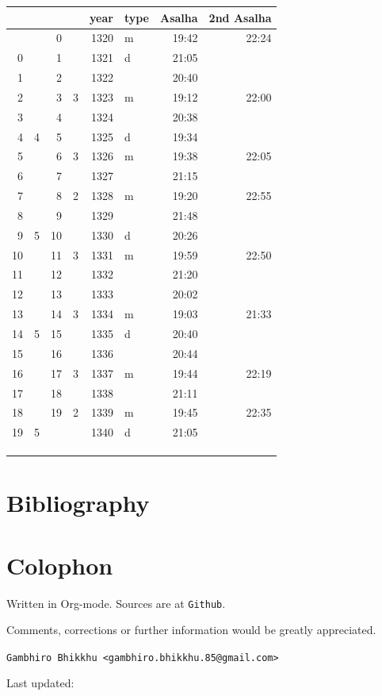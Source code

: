 \documentclass[11pt,oneside]{memoir-article}
\begin{document}
\begin{center}
\begin{tabular}{rrrrrlrr}
 &  &  &  & year & type & Asalha & 2nd Asalha\\
\hline
 &  & 0 &  & 1320 & m & 19:42 & 22:24\\
0 &  & 1 &  & 1321 & d & 21:05 & \\
1 &  & 2 &  & 1322 &  & 20:40 & \\
2 &  & 3 & 3 & 1323 & m & 19:12 & 22:00\\
3 &  & 4 &  & 1324 &  & 20:38 & \\
4 & 4 & 5 &  & 1325 & d & 19:34 & \\
5 &  & 6 & 3 & 1326 & m & 19:38 & 22:05\\
6 &  & 7 &  & 1327 &  & 21:15 & \\
7 &  & 8 & 2 & 1328 & m & 19:20 & 22:55\\
8 &  & 9 &  & 1329 &  & 21:48 & \\
9 & 5 & 10 &  & 1330 & d & 20:26 & \\
10 &  & 11 & 3 & 1331 & m & 19:59 & 22:50\\
11 &  & 12 &  & 1332 &  & 21:20 & \\
12 &  & 13 &  & 1333 &  & 20:02 & \\
13 &  & 14 & 3 & 1334 & m & 19:03 & 21:33\\
14 & 5 & 15 &  & 1335 & d & 20:40 & \\
15 &  & 16 &  & 1336 &  & 20:44 & \\
16 &  & 17 & 3 & 1337 & m & 19:44 & 22:19\\
17 &  & 18 &  & 1338 &  & 21:11 & \\
18 &  & 19 & 2 & 1339 & m & 19:45 & 22:35\\
19 & 5 &  &  & 1340 & d & 21:05 & \\
 &  &  &  &  &  &  & \\
 &  &  &  &  &  &  & \\
 &  &  &  &  &  &  & \\
\end{tabular}
\end{center}
\chapter{Bibliography}
\label{sec-5}





\chapter{Colophon}
\label{sec-6}

Written in Org-mode. Sources are at \texttt{Github}.

Comments, corrections or further information would be greatly
appreciated.

\texttt{Gambhiro Bhikkhu <gambhiro.bhikkhu.85@gmail.com>}

Last updated: 
\end{document}
